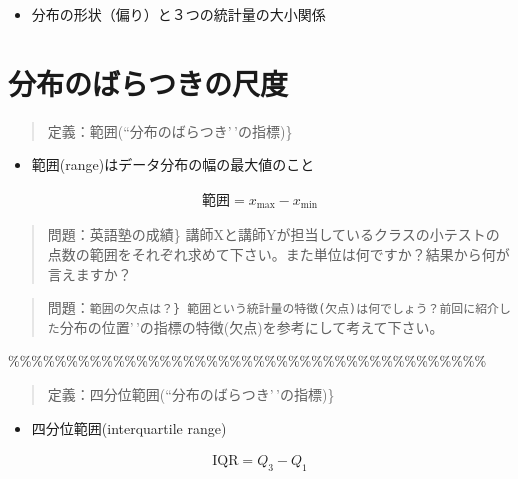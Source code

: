 \documentclass[
]{book}
\providecommand{\tightlist}{%
  \setlength{\itemsep}{0pt}\setlength{\parskip}{0pt}}
\theoremstyle{definition}
\theoremstyle{definition}
\theoremstyle{definition}
\theoremstyle{definition}
\theoremstyle{remark}
\begin{document}
\begin{itemize}
\tightlist
\item
  分布の形状（偏り）と３つの統計量の大小関係
\end{itemize}

\hypertarget{ux5206ux5e03ux306eux3070ux3089ux3064ux304dux306eux5c3aux5ea6}{%
\section{分布のばらつきの尺度}\label{ux5206ux5e03ux306eux3070ux3089ux3064ux304dux306eux5c3aux5ea6}}

\begin{quote}
定義：範囲(``分布のばらつき'\,'の指標)\}
\end{quote}

\begin{itemize}
\tightlist
\item
  範囲(range)はデータ分布の幅の最大値のこと
\end{itemize}

\begin{align*}
\text{範囲}=x_{\max}-x_{\min}
\end{align*}

\begin{quote}
問題：英語塾の成績\}
講師Xと講師Yが担当しているクラスの小テストの点数の範囲をそれぞれ求めて下さい。また単位は何ですか？結果から何が言えますか？
\end{quote}

\begin{quote}
問題：\texttt{範囲\textquotesingle{}\textquotesingle{}の欠点は？\}\ 範囲という統計量の特徴(欠点)は何でしょう？前回に紹介した}分布の位置'\,'の指標の特徴(欠点)を参考にして考えて下さい。
\end{quote}

\%\%\%\%\%\%\%\%\%\%\%\%\%\%\%\%\%\%\%\%\%\%\%\%\%\%\%\%\%\%\%\%\%\%\%\%\%\%\%\%\%

\begin{quote}
定義：四分位範囲(``分布のばらつき'\,'の指標)\}
\end{quote}

\begin{itemize}
\tightlist
\item
  四分位範囲(interquartile range)
\end{itemize}

\begin{align*}
\text{IQR}=Q_3-Q_1
\end{align*}
\end{document}
